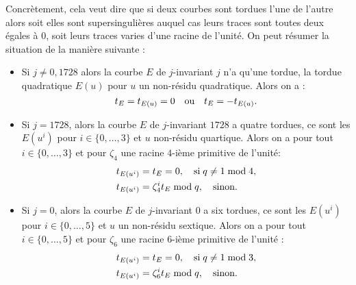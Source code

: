 \documentclass[a4paper]{article} %
\numberwithin{section}{part}
\numberwithin{equation}{section}
\newcommand\nroot[1]{\textit{#1}-ième}
\begin{document}
Concrètement, cela veut dire que si deux courbes sont tordues l'une de l'autre 
alors soit elles sont supersingulières auquel cas leurs traces sont toutes deux 
égales à $0$, soit leurs traces varies d'une racine de l'unité. On peut résumer 
la situation de la manière suivante :
\vspace{0.3cm}
\begin{itemize}
    \item Si $j\neq0, 1728$ alors la courbe $E$ de $j$-invariant $j$ n'a qu'une 
    tordue, la tordue quadratique $E(u)$ pour $u$ un non-résidu quadratique. 
    Alors on a :
    \begin{equation}
    t_E = t_{E(u)} = 0\quad\textup{ou}\quad t_E = -t_{E(u)}.
    \end{equation}

    \item Si $j = 1728$, alors la courbe $E$ de $j$-invariant $1728$ a quatre
    tordues, ce sont les $E(u^i)$ pour $i\in\lbrace{0,\dots,3}\rbrace$ et $u$
    non-résidu quartique. Alors on a pour tout $i\in\lbrace{0,\dots,3}\rbrace$ 
    et pour $\zeta_4$ une racine \nroot{$4$} primitive de l'unité:
        \begin{align}
        t_{E(u^i)} &= t_E = 0,\quad\textup{si\;}q\neq1\bmod4,\\
        t_{E(u^i)} &= \zeta_4^it_E\bmod q,\quad\textup{sinon.}
        \end{align}

    \item Si $j = 0$, alors la courbe $E$ de $j$-invariant $0$ a six tordues, ce
    sont les $E(u^i)$ pour $i\in\lbrace{0,\dots,5}\rbrace$ et $u$ un non-résidu
    sextique. Alors on a pour tout $i\in\lbrace{0,\dots,5}\rbrace$ et pour
    $\zeta_6$ une racine \nroot{$6$} primitive de l'unité :
        \begin{align}
        t_{E(u^i)} &= t_E = 0,\quad\textup{si\;}q\neq1\bmod3,\\
        t_{E(u^i)} &= \zeta_6^it_E\bmod q,\quad\textup{sinon.}
        \end{align}

\end{itemize}
\end{document}
